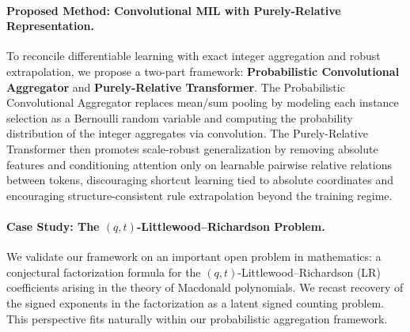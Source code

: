 \documentclass{article}
\theoremstyle{plain}
\theoremstyle{definition}
\theoremstyle{remark}
\begin{document}
\paragraph{Proposed Method: Convolutional MIL with Purely-Relative Representation.}
To reconcile differentiable learning with exact integer aggregation and robust extrapolation, we propose a two-part framework: \textbf{Probabilistic Convolutional Aggregator} and \textbf{Purely-Relative Transformer}.
The Probabilistic Convolutional Aggregator replaces mean/sum pooling by modeling each instance selection as a Bernoulli random variable and computing the probability distribution of the integer aggregates via convolution.
The Purely-Relative Transformer then promotes scale-robust generalization by removing absolute features and conditioning attention only on learnable pairwise relative relations between tokens, discouraging shortcut learning tied to absolute coordinates and encouraging structure-consistent rule extrapolation beyond the training regime.


    
	
	\paragraph{Case Study: The $(q,t)$-Littlewood--Richardson Problem.} 
	We validate our framework on an important open problem in mathematics: a conjectural factorization formula for the $(q,t)$-Littlewood--Richardson (LR) coefficients arising in the theory of Macdonald polynomials.
    We recast recovery of the signed exponents in the factorization as a latent signed counting problem.
    This perspective fits naturally within our probabilistic aggregation framework.
	
\end{document}

